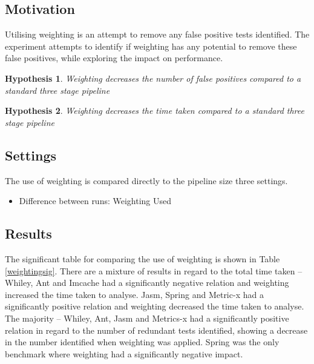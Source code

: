 \documentclass[11pt
              , a4paper
              , twoside
              , openright
              ]{report}
\newtheorem{hyp}{Hypothesis}
\begin{document}
\subsection{Motivation}
Utilising weighting is an attempt to remove any false positive tests identified. The experiment attempts to identify if weighting has any potential to remove these false positives, while exploring the impact on performance.

\begin{hyp}
Weighting decreases the number of false positives compared to a standard three stage pipeline
\end{hyp}

\begin{hyp}
Weighting decreases the time taken compared to a standard three stage pipeline
\end{hyp}

\subsection{Settings}
The use of weighting is compared directly to the pipeline size three settings.

\begin{itemize}
\item Difference between runs: Weighting Used
\end{itemize}

\subsection{Results}
The significant table for comparing the use of weighting is shown in Table \ref{weightingsig}. There are a mixture of results in regard to the total time taken -- Whiley, Ant and Imcache had a significantly negative relation and weighting increased the time taken to analyse. Jasm, Spring and Metric-x had a significantly positive relation and weighting decreased the time taken to analyse. The majority -- Whiley, Ant, Jasm and Metrics-x had a significantly positive relation in regard to the number of redundant tests identified, showing a decrease in the number identified when weighting was applied. Spring was the only benchmark where weighting had a significantly negative impact.
\end{document}
